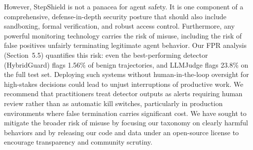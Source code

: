 \documentclass{article}
\begin{document}
However, StepShield is not a panacea for agent safety. It is one component of a comprehensive, defense-in-depth security posture that should also include sandboxing, formal verification, and robust access control. Furthermore, any powerful monitoring technology carries the risk of misuse, including the risk of false positives unfairly terminating legitimate agent behavior. Our FPR analysis (Section~5.5) quantifies this risk: even the best-performing detector (HybridGuard) flags 1.56\% of benign trajectories, and LLMJudge flags 23.8\% on the full test set. Deploying such systems without human-in-the-loop oversight for high-stakes decisions could lead to unjust interruptions of productive work. We recommend that practitioners treat detector outputs as alerts requiring human review rather than as automatic kill switches, particularly in production environments where false termination carries significant cost. We have sought to mitigate the broader risk of misuse by focusing our taxonomy on clearly harmful behaviors and by releasing our code and data under an open-source license to encourage transparency and community scrutiny.
\end{document}
